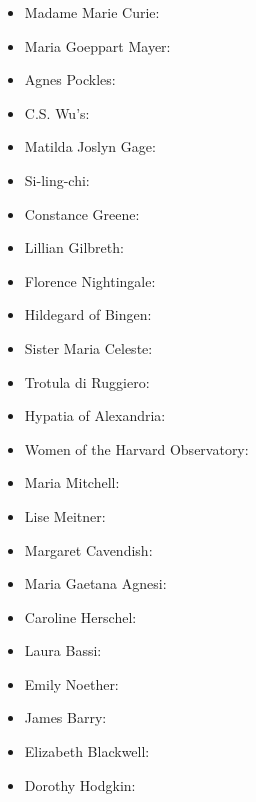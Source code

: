 \documentclass[12pt,a4paper]{article}
\begin{document}
  \clearpage
  \begin{itemize}
    \item Madame Marie Curie:\
    \item Maria Goeppart Mayer:\
    \item Agnes Pockles:\
    \item C.S. Wu’s:\
    \item Matilda Joslyn Gage:\
    \item Si-ling-chi:\
    \item Constance Greene:\
    \item Lillian Gilbreth:\
    \item Florence Nightingale:\
    \item Hildegard of Bingen:\
    \item Sister Maria Celeste:\
    \item Trotula di Ruggiero:\
    \item Hypatia of Alexandria:\
    \item Women of the Harvard Observatory:\
    \item Maria Mitchell:\
    \item Lise Meitner:\
    \item Margaret Cavendish:\
    \item Maria Gaetana Agnesi:\
    \item Caroline Herschel:\
    \item Laura Bassi:\
    \item Emily Noether:\
    \item James Barry:\
    \item Elizabeth Blackwell:\
    \item Dorothy Hodgkin:\
  \end{itemize}
\end{document}
